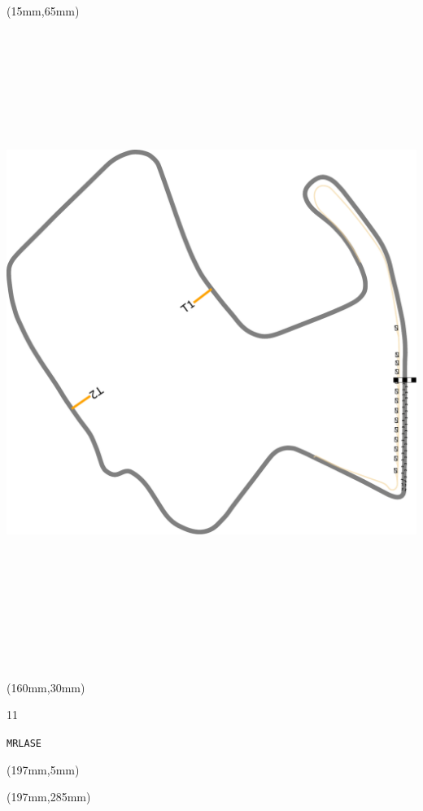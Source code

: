 \begin{textblock*}{185mm}(15mm,65mm)%
\centering
\mbox{\includegraphics[width=185mm,height=210mm,keepaspectratio]{PT/MRLASE.pdf}}
\end{textblock*}
\begin{textblock*}{40mm}(160mm,30mm)%
\Large
\par{} 
\par11 
\par\hfill\tiny\tt MRLASE\\
\end{textblock*}
\begin{textblock*}{20mm}(197mm,5mm)%
\fbox{\thepage}
\label{MRLASE}
\end{textblock*}
\begin{textblock*}{20mm}(197mm,285mm)%
\fbox{\thepage}
\end{textblock*}

